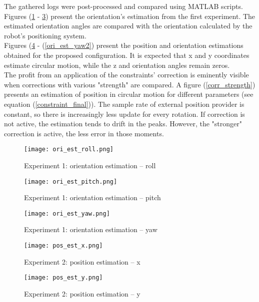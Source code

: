 The gathered logs were post-processed and compared using MATLAB scripts. Figures (\ref{ori_est_roll} - \ref{ori_est_yaw}) present the orientation's estimation from the first experiment. The estimated orientation angles are compared with the orientation calculated by the robot's positioning system.\\

Figures (\ref{pos_est_x} - (\ref{ori_est_yaw2}) present the position and orientation estimations obtained for the proposed configuration. It is expected that x and y coordinates estimate circular motion, while the z and orientation angles remain zeros.\\

The profit from an application of the constraints' correction is eminently visible when corrections with various "strength" are compared.
A figure (\ref{corr_strength}) presents an estimation of position in circular motion for different parameters (see equation (\ref{constraint_final})). The sample rate of external position provider is constant, so there is increasingly less update for every rotation. If correction is not active, the estimation tends to drift in the peaks. However, the "stronger" correction is active, the less error in those moments.


\begin{figure}[p]
	\centering
	\texttt{[image: ori\_est\_roll.png]}
	\caption{Experiment 1: orientation estimation -- roll}
	\label{ori_est_roll}
\end{figure}

\begin{figure}[p]
	\centering
	\texttt{[image: ori\_est\_pitch.png]}
	\caption{Experiment 1: orientation estimation -- pitch}
	\label{ori_est_pitch}
\end{figure}


\begin{figure}[p]
	\centering
	\texttt{[image: ori\_est\_yaw.png]}
	\caption{Experiment 1: orientation estimation -- yaw}
	\label{ori_est_yaw}
\end{figure}

\begin{figure}[p]
	\centering
	\texttt{[image: pos\_est\_x.png]}
	\caption{Experiment 2: position estimation -- x}
	\label{pos_est_x}
\end{figure}

\begin{figure}[p]
	\centering
	\texttt{[image: pos\_est\_y.png]}
	\caption{Experiment 2: position estimation -- y}
	\label{pos_est_y}
\end{figure}

